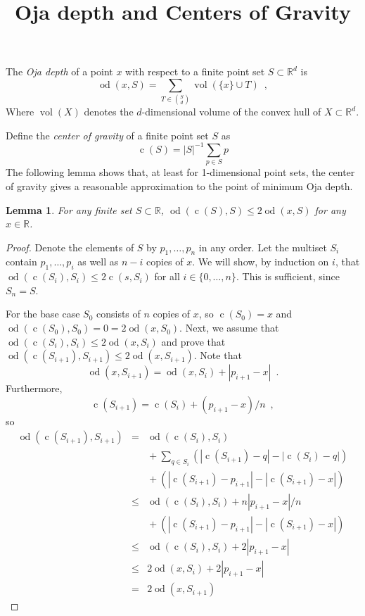 \documentclass{article}
\title{Oja depth and Centers of Gravity}
\newcommand{\R}{\mathbb{R}}
\DeclareMathOperator{\od}{od}
\DeclareMathOperator{\vol}{vol}
\DeclareMathOperator{\cog}{c}
\newtheorem{lem}{Lemma}
\begin{document}
The \emph{Oja depth} of a point $x$ with respect to a finite point set
$S\subset \R^d$ is
\[
  \od(x,S) = %
             \sum_{T\in\binom{S}{d}}
             \vol(\{x\}\cup T) \enspace ,
\]
Where $\vol(X)$ denotes the $d$-dimensional volume of the
convex hull of $X\subset\R^d$.

Define the \emph{center of gravity} of a finite point set $S$ as
\[
    \cog(S) = |S|^{-1}\sum_{p\in S} p
\]
The following lemma shows that, at least for 1-dimensional point sets, the
center of gravity gives a reasonable approximation to the point of minimum
Oja depth.

\begin{lem}
For any finite set $S\subset\R$, $\od(\cog(S),S) \le 2\od(x,S)$ for
any $x\in\R$.
\end{lem}

\begin{proof}
Denote the elements of $S$ by $p_1,\ldots,p_n$ in any order.  Let the
multiset $S_i$ contain $p_1,\ldots,p_i$ as well as $n-i$ copies of
$x$.  We will show, by induction on $i$, that $\od(\cog(S_i),S_i)\le
2\cog(s,S_i)$ for all $i\in\{0,\ldots,n\}$.  This is sufficient,
since $S_n=S$.

For the base case $S_0$ consists of $n$ copies of $x$, so
$\cog(S_0)=x$ and $\od(\cog(S_0),S_0)= 0 = 2\od(x,S_0)$.  Next,
we assume that $\od(\cog(S_i),S_i) \le 2\od(x,S_i)$ and prove that
$\od(\cog(S_{i+1}),S_{i+1}) \le 2\od(x,S_{i+1})$.  Note that
\[
   \od(x,S_{i+1}) = \od(x,S_i) + |p_{i+1}-x| \enspace .
\]
Furthermore, 
\[
   \cog(S_{i+1}) = \cog(S_i) + (p_{i+1}-x)/n \enspace ,
\]
so
\begin{eqnarray*}
   \od(\cog(S_{i+1}), S_{i+1}) 
     & = & \od(\cog(S_{i}), S_{i}) \\ 
    &&    {} + \sum_{q\in S_i} (|\cog(S_{i+1}) - q| - |\cog(S_{i}) - q|) \\
    &&    {} + (|\cog(S_{i+1}) - p_{i+1}| - |\cog(S_{i+1}) - x|) \\
     & \le & \od(\cog(S_{i}), S_{i}) 
             + n|p_{i+1}-x|/n  \\
    &&    {} + (|\cog(S_{i+1}) - p_{i+1}| - |\cog(S_{i+1}) - x|) \\
     & \le & \od(\cog(S_{i}), S_{i}) 
             + 2|p_{i+1}-x|  \\
     & \le & 2\od(x, S_{i}) 
             + 2|p_{i+1}-x|  \\
     &  = & 2\od(x, S_{i+1}) 
\end{eqnarray*}

\end{proof}
\end{document}
